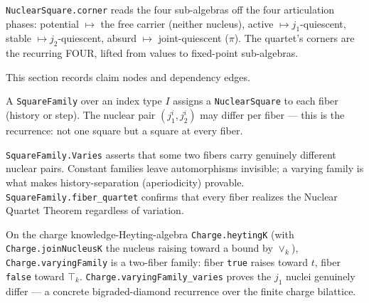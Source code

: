 \begin{proposition}\label{thm:quartet-corner}\leanok{}
\texttt{NuclearSquare.corner} reads the four sub-algebras off the four articulation phases: potential $\mapsto$ the free carrier (neither nucleus), active $\mapsto j_1$-quiescent, stable $\mapsto j_2$-quiescent, absurd $\mapsto$ joint-quiescent ($\pi$). The quartet's corners are the recurring FOUR, lifted from values to fixed-point sub-algebras.
\end{proposition}

This section records claim nodes and dependency edges.

\begin{proposition}\label{thm:square-family}\leanok{}
A \texttt{SquareFamily} over an index type $I$ assigns a \texttt{NuclearSquare} to each fiber (history or step). The nuclear pair $(j_1^i, j_2^i)$ may differ per fiber --- this is the recurrence: not one square but a square at every fiber.
\end{proposition}
\begin{proposition}\label{thm:varies}\leanok{}
\texttt{SquareFamily.Varies} asserts that some two fibers carry genuinely different nuclear pairs. Constant families leave automorphisms invisible; a varying family is what makes history-separation (aperiodicity) provable. \texttt{SquareFamily.fiber\_quartet} confirms that every fiber realizes the Nuclear Quartet Theorem regardless of variation.
\end{proposition}
\begin{example}\label{ex:varying-family}\leanok{}
On the charge knowledge-Heyting-algebra \texttt{Charge.heytingK} (with \texttt{Charge.joinNucleusK} the nucleus raising toward a bound by $\vee_k$), \texttt{Charge.varyingFamily} is a two-fiber family: fiber \texttt{true} raises toward $t$, fiber \texttt{false} toward $\top_k$. \texttt{Charge.varyingFamily\_varies} proves the $j_1$ nuclei genuinely differ --- a concrete bigraded-diamond recurrence over the finite charge bilattice.
\end{example}
